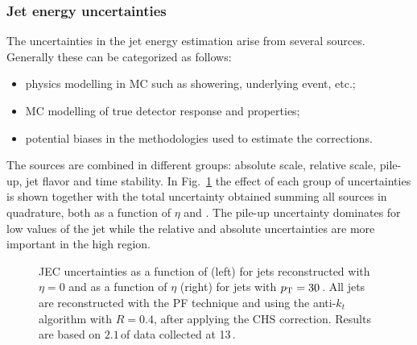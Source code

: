 \subsubsection{Jet energy uncertainties}

The uncertainties in the jet energy estimation arise from several sources. Generally these can be categorized as follows:
\begin{itemize}
\item physics modelling in MC such as showering, underlying event, etc.;
\item MC modelling of true detector response and properties;
\item potential biases in the methodologies used to estimate the corrections.
\end{itemize}
The sources are combined in different groups: absolute scale, relative scale, pile-up, jet flavor and time stability. In Fig.~\ref{fig:JECunc} the effect of each group of uncertainties is shown together with the total uncertainty obtained summing all sources in quadrature, both as a function of $\eta$ and \pt. The pile-up uncertainty dominates for low values of the jet \pt while the relative and absolute uncertainties are more important in the high \pt region.

\begin{figure}[htb]
\centering
{}
\caption{JEC uncertainties as a function of \pt (left) for jets reconstructed with $\eta=0$ and as a function of $\eta$ (right) for jets with $p_\mathrm{T}=30$\,\GeV. All jets are reconstructed with the PF technique and using the anti-$k_t$ algorithm with $R=0.4$, after applying the CHS correction. Results are based on $2.1$\,\ifb of data collected at 13\,\TeV.}\label{fig:JECunc}
\end{figure}

